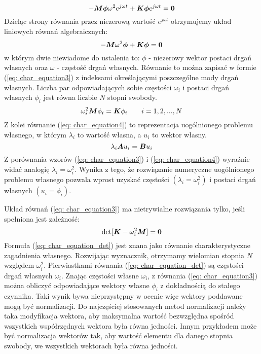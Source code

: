 \begin{equation} \label{eq: char_equation1}
-\bm{M}\bm{\phi}\omega^2 e^{j\omega t} +\bm{K\phi}e^{j\omega t} = \bm{0}
\end{equation}
Dzieląc strony równania przez niezerową wartość $e^{j\omega t}$ otrzymujemy układ liniowych równań algebraicznych:
\begin{equation} \label{eq: char_equation2}
-\bm{M}\omega^2 \bm{\phi} +\bm{K\phi} = \bm{0}
\end{equation}
w którym dwie niewiadome do ustalenia to: $\phi$ - niezerowy wektor postaci drgań własnych oraz $\omega$ - częstość drgań własnych. Równanie to można zapisać w formie (\ref{eq: char_equation3}) z indeksami określającymi poszczególne mody drgań własnych. Liczba par odpowiadających sobie częstości $\omega_i$ i postaci drgań własnych $\phi_i$ jest równa liczbie $N$ stopni swobody. 
\begin{equation} \label{eq: char_equation3}
\omega^2_i \bm{M}\phi_i = \bm{K}\phi_i\qquad i=1,2,...,N
\end{equation}
Z kolei równanie (\ref{eq: char_equation4}) to reprezentacja uogólnionego problemu własnego, w którym $\lambda_i$ to wartość własna, a $u_i$ to wektor własny.  
\begin{equation} \label{eq: char_equation4}
\lambda_i \bm{A}u_i = \bm{B}u_i
\end{equation}
Z porównania wzorów (\ref{eq: char_equation3}) i (\ref{eq: char_equation4}) wyraźnie widać analogię $\lambda_i=\omega^2_i$. Wynika z tego, że rozwiązanie numeryczne uogólnionego problemu własnego pozwala wprost uzyskać częstości $(\lambda_i=\omega^2_i)$ i postaci drgań własnych $(u_i=\phi_i)$.

Układ równań (\ref{eq: char_equation3}) ma nietrywialne rozwiązania tylko, jeśli spełniona jest zależność:
\begin{equation} \label{eq: char_equation_det}
\det[\bm{K}-\omega^2_i \bm{M}] = \bm{0}
\end{equation}
Formuła (\ref{eq: char_equation_det}) jest znana jako równanie charakterystyczne zagadnienia własnego. Rozwijając wyznacznik, otrzymamy wielomian stopnia $N$ względem $\omega^2_i$. Pierwiastkami równania (\ref{eq: char_equation_det}) są częstości drgań własnych $\omega_i$. Znając częstości własne $\omega_i$, z równania (\ref{eq: char_equation3}) można obliczyć odpowiadające wektory własne $\phi_i$ z dokładnością do stałego czynnika. Taki wynik bywa nieprzystępny w ocenie więc wektory poddawane mogą być normalizacji. Do najczęściej stosowanych metod normalizacji należy taka modyfikacja wektora, aby maksymalna wartość bezwzględna spośród wszystkich współrzędnych wektora była równa jedności. Innym przykładem może być normalizacja wektorów tak, aby wartość elementu dla danego stopnia swobody, we wszystkich wektorach była równa jedności.


